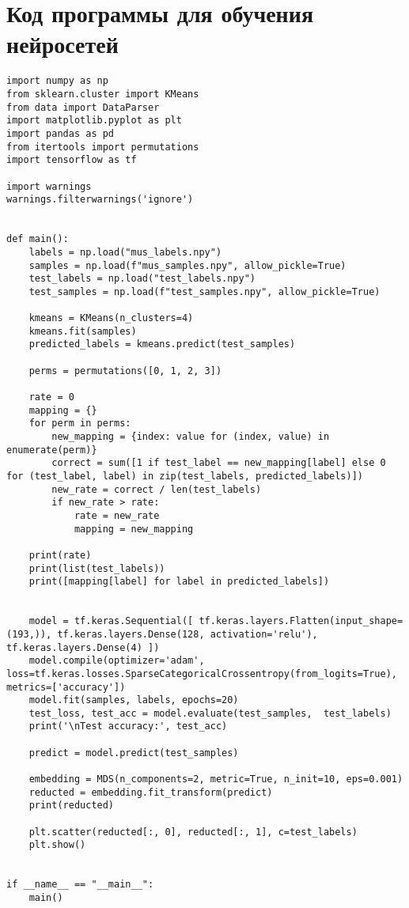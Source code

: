 \section*{\centering Код программы для обучения нейросетей}
\begin{footnotesize}
\begin{lstlisting}
import numpy as np
from sklearn.cluster import KMeans
from data import DataParser
import matplotlib.pyplot as plt
import pandas as pd
from itertools import permutations 
import tensorflow as tf

import warnings
warnings.filterwarnings('ignore')


def main():
    labels = np.load("mus_labels.npy")
    samples = np.load(f"mus_samples.npy", allow_pickle=True)
    test_labels = np.load("test_labels.npy")
    test_samples = np.load(f"test_samples.npy", allow_pickle=True)

    kmeans = KMeans(n_clusters=4)
    kmeans.fit(samples)
    predicted_labels = kmeans.predict(test_samples)

    perms = permutations([0, 1, 2, 3]) 

    rate = 0
    mapping = {}
    for perm in perms:
        new_mapping = {index: value for (index, value) in enumerate(perm)}
        correct = sum([1 if test_label == new_mapping[label] else 0 for (test_label, label) in zip(test_labels, predicted_labels)])
        new_rate = correct / len(test_labels)
        if new_rate > rate:
            rate = new_rate
            mapping = new_mapping

    print(rate)
    print(list(test_labels))
    print([mapping[label] for label in predicted_labels])


    model = tf.keras.Sequential([ tf.keras.layers.Flatten(input_shape=(193,)), tf.keras.layers.Dense(128, activation='relu'), tf.keras.layers.Dense(4) ])
    model.compile(optimizer='adam', loss=tf.keras.losses.SparseCategoricalCrossentropy(from_logits=True), metrics=['accuracy'])
    model.fit(samples, labels, epochs=20)
    test_loss, test_acc = model.evaluate(test_samples,  test_labels)
    print('\nTest accuracy:', test_acc)

    predict = model.predict(test_samples)

    embedding = MDS(n_components=2, metric=True, n_init=10, eps=0.001)
    reducted = embedding.fit_transform(predict)
    print(reducted)

    plt.scatter(reducted[:, 0], reducted[:, 1], c=test_labels)
    plt.show()


if __name__ == "__main__":
    main()
\end{lstlisting}
\end{footnotesize}